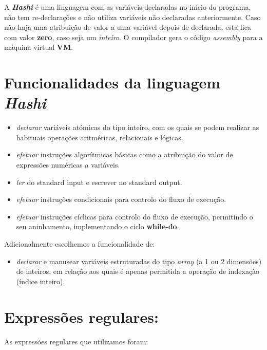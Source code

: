 \documentclass[11pt,a4paper]{report}
\begin{document}
    A\textbf{\textit{ Hashi}} é uma linguagem com as variáveis declaradas no início do programa, não tem re-declarações e não utiliza variáveis não declaradas anteriormente. Caso não haja uma atribuição de valor a uma variável depois de declarada, esta fica com valor \textbf{zero}, caso seja um\textit{ inteiro}. O compilador gera o código \textit{assembly} para a máquina virtual \textbf{VM}.  
    
	\section{Funcionalidades da linguagem \textit{{{Hashi}}} }

		\begin{itemize}
\item\textit{declarar} variáveis atómicas do tipo inteiro, com os quais se podem realizar as habituais operações aritméticas, relacionais e lógicas.
	     \item\textit{ efetuar} instruções algorítmicas básicas como a atribuição do valor de expressões numéricas a variáveis.
	     \item \textit{ler} do standard input e escrever no standard output.
         \item \textit{efetuar} instruções condicionais para controlo do fluxo de execução.
         \item \textit{efetuar} instruções cíclicas para controlo do fluxo de execução, permitindo o seu aninhamento, implementando o ciclo\textbf{ while-do}.
         \end{itemize}
        Adicionalmente escolhemos a funcionalidade de:
\begin{itemize}
\item \textit{declarar} e manusear variáveis estruturadas do tipo \textit{array} (a 1 ou 2 dimensões) de inteiros, em relação aos quais é apenas permitida a operação de indexação (índice inteiro).
\end{itemize}
         
\pagebreak

\section{Expressões regulares:}
	
	As expressões regulares que utilizamos foram:
    
\end{document}
